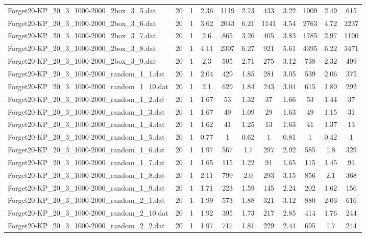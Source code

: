 \begin{table}[!ht]
\begin{tabular}{lcccccccccc}
Forget20-KP\_20\_3\_1000-2000\_2box\_3\_5.dat & 20 & 1 & 2.36 & 1119 & 2.73 & 433 & 3.22 & 1009 & 2.49 & 615 \\
Forget20-KP\_20\_3\_1000-2000\_2box\_3\_6.dat & 20 & 1 & 3.62 & 2043 & 6.21 & 1141 & 4.54 & 2763 & 4.72 & 2237 \\
Forget20-KP\_20\_3\_1000-2000\_2box\_3\_7.dat & 20 & 1 & 2.6 & 865 & 3.26 & 405 & 3.83 & 1785 & 2.97 & 1190 \\
Forget20-KP\_20\_3\_1000-2000\_2box\_3\_8.dat & 20 & 1 & 4.11 & 2307 & 6.27 & 921 & 5.61 & 4395 & 6.22 & 3471 \\
Forget20-KP\_20\_3\_1000-2000\_2box\_3\_9.dat & 20 & 1 & 2.3 & 505 & 2.71 & 275 & 3.12 & 738 & 2.32 & 499 \\
Forget20-KP\_20\_3\_1000-2000\_random\_1\_1.dat & 20 & 1 & 2.04 & 429 & 1.85 & 281 & 3.05 & 539 & 2.06 & 375 \\
Forget20-KP\_20\_3\_1000-2000\_random\_1\_10.dat & 20 & 1 & 2.1 & 629 & 1.84 & 243 & 3.04 & 615 & 1.89 & 292 \\
Forget20-KP\_20\_3\_1000-2000\_random\_1\_2.dat & 20 & 1 & 1.67 & 53 & 1.32 & 37 & 1.66 & 53 & 1.44 & 37 \\
Forget20-KP\_20\_3\_1000-2000\_random\_1\_3.dat & 20 & 1 & 1.67 & 49 & 1.09 & 29 & 1.63 & 49 & 1.15 & 31 \\
Forget20-KP\_20\_3\_1000-2000\_random\_1\_4.dat & 20 & 1 & 1.62 & 41 & 1.25 & 13 & 1.63 & 41 & 1.37 & 13 \\
Forget20-KP\_20\_3\_1000-2000\_random\_1\_5.dat & 20 & 1 & 0.77 & 1 & 0.62 & 1 & 0.81 & 1 & 0.42 & 1 \\
Forget20-KP\_20\_3\_1000-2000\_random\_1\_6.dat & 20 & 1 & 1.97 & 567 & 1.7 & 297 & 2.92 & 585 & 1.8 & 329 \\
Forget20-KP\_20\_3\_1000-2000\_random\_1\_7.dat & 20 & 1 & 1.65 & 115 & 1.22 & 91 & 1.65 & 115 & 1.45 & 91 \\
Forget20-KP\_20\_3\_1000-2000\_random\_1\_8.dat & 20 & 1 & 2.11 & 799 & 2.0 & 293 & 3.15 & 856 & 2.1 & 368 \\
Forget20-KP\_20\_3\_1000-2000\_random\_1\_9.dat & 20 & 1 & 1.71 & 223 & 1.59 & 145 & 2.24 & 202 & 1.62 & 156 \\
Forget20-KP\_20\_3\_1000-2000\_random\_2\_1.dat & 20 & 1 & 1.99 & 573 & 1.88 & 321 & 3.12 & 880 & 2.03 & 616 \\
Forget20-KP\_20\_3\_1000-2000\_random\_2\_10.dat & 20 & 1 & 1.92 & 395 & 1.73 & 217 & 2.85 & 414 & 1.76 & 244 \\
Forget20-KP\_20\_3\_1000-2000\_random\_2\_2.dat & 20 & 1 & 1.97 & 717 & 1.81 & 229 & 2.44 & 695 & 1.7 & 244 \\

\end{tabular}
\end{table}
